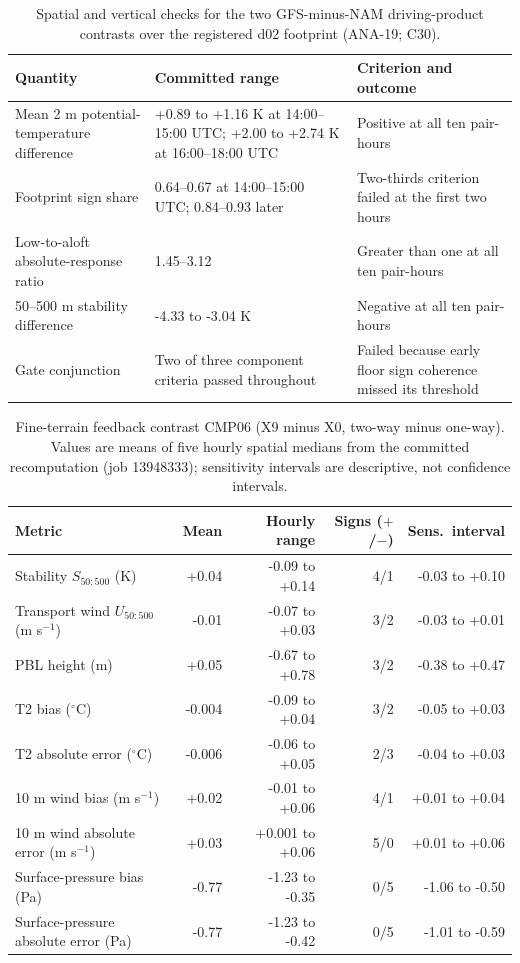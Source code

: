 \documentclass[air,article,submit,moreauthors]{Definitions/mdpi}
\begin{document}
\begin{table}[H]
\caption{Spatial and vertical checks for the two GFS-minus-NAM driving-product contrasts over the registered d02 footprint (ANA-19; C30).}
\label{tab:v3-spatial-summary}
\centering
\small
\begin{tabularx}{\textwidth}{lLL}
\toprule
Quantity & Committed range & Criterion and outcome \\
\midrule
Mean 2 m potential-temperature difference & +0.89 to +1.16 K at 14:00--15:00 UTC; +2.00 to +2.74 K at 16:00--18:00 UTC & Positive at all ten pair-hours \\
Footprint sign share & 0.64--0.67 at 14:00--15:00 UTC; 0.84--0.93 later & Two-thirds criterion failed at the first two hours \\
Low-to-aloft absolute-response ratio & 1.45--3.12 & Greater than one at all ten pair-hours \\
50--500 m stability difference & -4.33 to -3.04 K & Negative at all ten pair-hours \\
Gate conjunction & Two of three component criteria passed throughout & Failed because early floor sign coherence missed its threshold \\
\bottomrule
\end{tabularx}
\end{table}

\begin{table}[H]
\caption{Fine-terrain feedback contrast CMP06 (X9 minus X0, two-way minus one-way).
Values are means of five hourly spatial medians from the committed recomputation (job 13948333); sensitivity intervals are descriptive, not confidence intervals.}
\label{tab:v3-cmp06}
\centering
\footnotesize
\begin{tabular}{lrrrr}
\toprule
Metric & Mean & Hourly range & Signs ($+$/$-$) & Sens.\ interval \\
\midrule
Stability $S_{50:500}$ (K) & +0.04 & -0.09 to +0.14 & 4/1 & -0.03 to +0.10 \\
Transport wind $U_{50:500}$ (m s$^{-1}$) & -0.01 & -0.07 to +0.03 & 3/2 & -0.03 to +0.01 \\
PBL height (m) & +0.05 & -0.67 to +0.78 & 3/2 & -0.38 to +0.47 \\
T2 bias ($^{\circ}$C) & -0.004 & -0.09 to +0.04 & 3/2 & -0.05 to +0.03 \\
T2 absolute error ($^{\circ}$C) & -0.006 & -0.06 to +0.05 & 2/3 & -0.04 to +0.03 \\
10 m wind bias (m s$^{-1}$) & +0.02 & -0.01 to +0.06 & 4/1 & +0.01 to +0.04 \\
10 m wind absolute error (m s$^{-1}$) & +0.03 & +0.001 to +0.06 & 5/0 & +0.01 to +0.06 \\
Surface-pressure bias (Pa) & -0.77 & -1.23 to -0.35 & 0/5 & -1.06 to -0.50 \\
Surface-pressure absolute error (Pa) & -0.77 & -1.23 to -0.42 & 0/5 & -1.01 to -0.59 \\
\bottomrule
\end{tabular}
\end{table}
\end{document}
